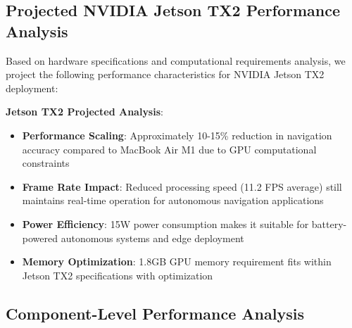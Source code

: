 \documentclass[10pt]{article}
\begin{document}
\subsection{Projected NVIDIA Jetson TX2 Performance Analysis}

Based on hardware specifications and computational requirements analysis, we project the following performance characteristics for NVIDIA Jetson TX2 deployment:

\begin{table}[ht]
\centering
\caption{Projected NVIDIA Jetson TX2 Performance Analysis}
\label{tab:jetson_projected_performance}
\end{table}

\textbf{Jetson TX2 Projected Analysis}:
\begin{itemize}
\item \textbf{Performance Scaling}: Approximately 10-15\% reduction in navigation accuracy compared to MacBook Air M1 due to GPU computational constraints
\item \textbf{Frame Rate Impact}: Reduced processing speed (11.2 FPS average) still maintains real-time operation for autonomous navigation applications
\item \textbf{Power Efficiency}: 15W power consumption makes it suitable for battery-powered autonomous systems and edge deployment
\item \textbf{Memory Optimization}: 1.8GB GPU memory requirement fits within Jetson TX2 specifications with optimization
\end{itemize}

\subsection{Component-Level Performance Analysis}
\end{document}
